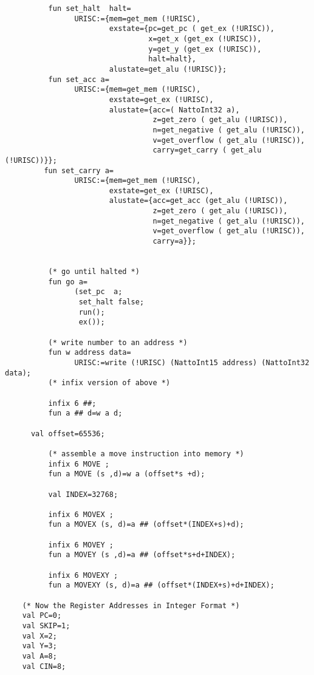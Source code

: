 \begin{verbatim}
          fun set_halt  halt= 
                URISC:={mem=get_mem (!URISC), 
                        exstate={pc=get_pc ( get_ex (!URISC)), 
                                 x=get_x (get_ex (!URISC)), 
                                 y=get_y (get_ex (!URISC)), 
                                 halt=halt},
                        alustate=get_alu (!URISC)};
          fun set_acc a= 
                URISC:={mem=get_mem (!URISC), 
                        exstate=get_ex (!URISC), 
                        alustate={acc=( NattoInt32 a),
                                  z=get_zero ( get_alu (!URISC)),
                                  n=get_negative ( get_alu (!URISC)),
                                  v=get_overflow ( get_alu (!URISC)),
                                  carry=get_carry ( get_alu (!URISC))}};
         fun set_carry a= 
                URISC:={mem=get_mem (!URISC), 
                        exstate=get_ex (!URISC), 
                        alustate={acc=get_acc (get_alu (!URISC)),
                                  z=get_zero ( get_alu (!URISC)),
                                  n=get_negative ( get_alu (!URISC)),
                                  v=get_overflow ( get_alu (!URISC)),
                                  carry=a}};


          (* go until halted *) 
          fun go a= 
                (set_pc  a; 
                 set_halt false; 
                 run(); 
                 ex());  
           
          (* write number to an address *) 
          fun w address data= 
                URISC:=write (!URISC) (NattoInt15 address) (NattoInt32 data); 
          (* infix version of above *)

          infix 6 ##;
          fun a ## d=w a d;
	
	  val offset=65536;

          (* assemble a move instruction into memory *)
          infix 6 MOVE ; 
          fun a MOVE (s ,d)=w a (offset*s +d); 

          val INDEX=32768;

          infix 6 MOVEX ;
          fun a MOVEX (s, d)=a ## (offset*(INDEX+s)+d);

          infix 6 MOVEY ;
          fun a MOVEY (s ,d)=a ## (offset*s+d+INDEX);

          infix 6 MOVEXY ;
          fun a MOVEXY (s, d)=a ## (offset*(INDEX+s)+d+INDEX);

	(* Now the Register Addresses in Integer Format *)
	val PC=0;
	val SKIP=1;
	val X=2;
	val Y=3;
	val A=8;
	val CIN=8;


\end{verbatim}
